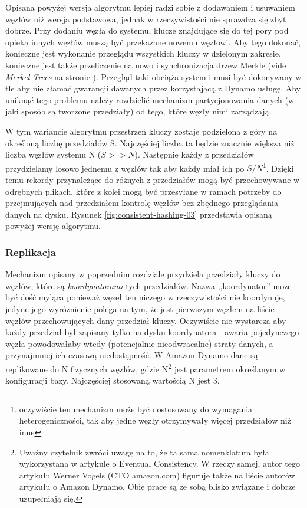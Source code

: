 
Opisana powyżej wersja algorytmu lepiej radzi sobie z dodawaniem i usuwaniem węzłów niż wersja podstawowa, jednak w rzeczywistości nie sprawdza się zbyt dobrze.
Przy dodaniu węzła do systemu, klucze znajdujące się do tej pory pod opieką innych węzłów muszą być przekazane nowemu węzłowi.
Aby tego dokonać, konieczne jest wykonanie przeglądu wszystkich kluczy w dzielonym zakresie, konieczne jest także przeliczenie na nowo i synchronizacja drzew Merkle (vide \emph{Merkel Trees} na stronie \pageref{merkle-trees}). 
Przegląd taki obciąża system i musi być dokonywany w tle aby nie złamać gwarancji dawanych przez korzystającą z Dynamo usługę.
Aby uniknąć tego problemu należy rozdzielić mechanizm partycjonowania danych (w jaki sposób są tworzone przedziały) od tego, które węzły nimi zarządzają.

W tym wariancie algorytmu przestrzeń kluczy zostaje podzielona z góry na określoną liczbę przedziałów S.
Najczęściej liczba ta będzie znacznie większa niż liczba węzłów systemu N ($S >> N$).
Następnie każdy z przedziałów przydzielamy losowo jednemu z węzłów tak aby każdy miał ich po $S/N$\footnote{oczywiście ten mechanizm może być dostosowany do wymagania heterogeniczności, tak aby jedne węzły otrzymywały więcej przedziałów niż inne}.
Dzięki temu rekordy przynależące do różnych z przedziałów mogą być przechowywane w odrębnych plikach, które z kolei mogą być przesyłane w ramach potrzeby do przejmujących nad przedziałem kontrolę węzłów bez zbędnego przeglądania danych na dysku.
Rysunek \ref{fig:consistent-hashing-03} przedstawia opisaną powyżej wersję algorytmu.


\subsubsection*{Replikacja}
\label{sec:dynamo-replikacja}

Mechanizm opisany w poprzednim rozdziale przydziela przedziały kluczy do węzłów, które są \emph{koordynatorami} tych przedziałów.
Nazwa ,,koordynator'' może być dość myląca ponieważ węzeł ten niczego w rzeczywistości nie koordynuje, jedyne jego wyróżnienie polega na tym, że jest pierwszym węzłem na liście węzłów przechowujących dany przedział kluczy.
Oczywiście nie wystarcza aby każdy przedział był zapisany tylko na dysku koordynatora - awaria pojedynczego węzła powodowałaby wtedy (potencjalnie nieodwracalne) straty danych, a przynajmniej ich czasową niedostępność.
W Amazon Dynamo dane są replikowane do N fizycznych węzłów, gdzie N\footnote{
Uważny czytelnik zwróci uwagę na to, że ta sama nomenklatura była wykorzystana w artykule o Eventual Consistency.
W rzeczy samej, autor tego artykułu Werner Vogels (CTO amazon.com) figuruje także na liście autorów artykułu o Amazon Dynamo.
Obie prace są ze sobą blisko związane i dobrze uzupełniają się.
}
jest parametrem określanym w konfiguracji bazy.
Najczęściej stosowaną wartością N jest 3.

